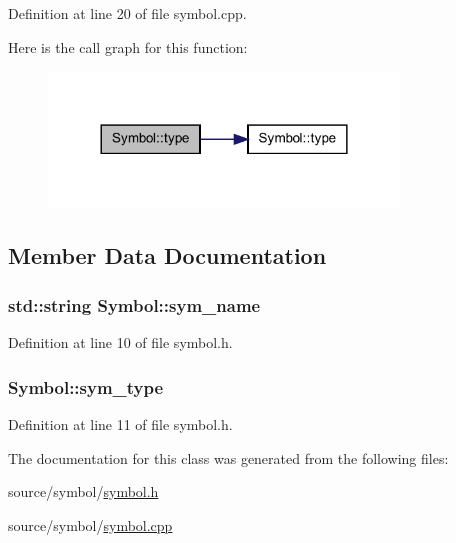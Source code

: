 Definition at line 20 of file symbol.cpp.



Here is the call graph for this function:\nopagebreak
\begin{figure}[H]
\begin{center}
\leavevmode
\includegraphics[width=264pt]{class_symbol_a7822b485af2e735d462276836479ff24_cgraph}
\end{center}
\end{figure}




\subsection{Member Data Documentation}
\hypertarget{class_symbol_a131f02876f25c9bdccbd71e1e7147989}{
\subsubsection[{sym\_\-name}]{\setlength{\rightskip}{0pt plus 5cm}std::string {\bf Symbol::sym\_\-name}}}
\label{class_symbol_a131f02876f25c9bdccbd71e1e7147989}


Definition at line 10 of file symbol.h.

\hypertarget{class_symbol_a4cb69009155bb4a73a86fc4004655a31}{
\subsubsection[{sym\_\-type}]{ {\bf Symbol::sym\_\-type}}}
\label{class_symbol_a4cb69009155bb4a73a86fc4004655a31}


Definition at line 11 of file symbol.h.



The documentation for this class was generated from the following files:\begin{DoxyCompactItemize}
\item 
source/symbol/\hyperlink{symbol_8h}{symbol.h}\item 
source/symbol/\hyperlink{symbol_8cpp}{symbol.cpp}\end{DoxyCompactItemize}
